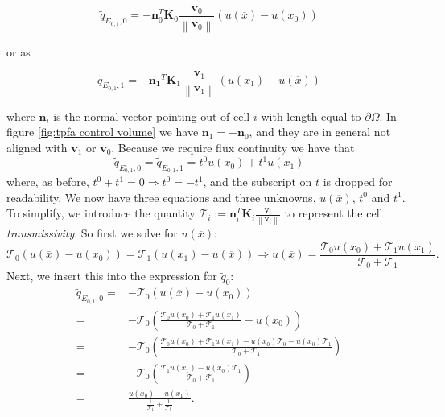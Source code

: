 \documentclass[../Main/main.tex]{subfiles}
\begin{document}
	\begin{equation}\label{eq:f_0}
		\tilde{q}_{E_{0,1},0}=-\bm{n}_0^T \bm{K}_0  \frac{\bm{v}_0}{\left \| \bm{v}_0 \right \|} (u(\overline{x})-u(x_0))
	\end{equation}
	
	or as
	
	\begin{equation}\label{eq:f_1}
		\tilde{q}_{E_{0,1},1} = -\bm{n_1}^T \bm{K}_1  \frac{\bm{v}_1}{\left \| \bm{v}_1 \right \|} (u(x_1)-u(\overline{x}))
	\end{equation}	
	
	where $\bm{n}_i$ is the normal vector pointing out of cell $i$ with length equal to $\partial \Omega$. In figure \ref{fig:tpfa control volume} we have $\bm{n}_1 = -\bm{n}_0$, and they are in general not aligned with $\bm{v}_1$ or $\bm{v}_0$.
	Because we require flux continuity we have that 
	\begin{equation}
		\tilde{q}_{E_{0,1},0} = \tilde{q}_{E_{0,1},1} = t^0 u(x_0) + t^1 u(x_1)
	\end{equation}
	where, as before, $t^0 + t^1 = 0 \Rightarrow t^0 = -t^1$, and the subscript on $t$ is dropped for readability. We now have three equations and three unknowns, $u(\overline{x})$, $t^0$ and $t^1$. To simplify, we introduce the quantity $\mathcal{T}_i := \bm{n}_i^T \bm{K}_i  \frac{\bm{v}_i}{\left \| \bm{v}_i \right \|} $ to represent the cell \emph{transmissivity}. So first we solve for $u(\overline{x})$:
	\begin{equation}
		\mathcal{T}_0(u(\overline{x})-u(x_0)) = \mathcal{T}_1(u(x_1)-u(\overline{x})) \Rightarrow u(\overline{x}) = \frac{\mathcal{T}_0 u(x_0) + \mathcal{T}_1 u(x_1)}{\mathcal{T}_0 + \mathcal{T}_1}.
	\end{equation}
	Next, we insert this into the expression for $\tilde{q}_0$:
	\begin{equation}
		\begin{aligned}
			\tilde{q}_{E_{0,1},0} =& -\mathcal{T}_0(u(\overline{x})-u(x_0)) \\
			=& -\mathcal{T}_0\left (\frac{\mathcal{T}_0 u(x_0) + \mathcal{T}_1 u(x_1)}{\mathcal{T}_0 + \mathcal{T}_1} - u(x_0)\right )\\
			=& -\mathcal{T}_0\left (\frac{\mathcal{T}_0 u(x_0) + \mathcal{T}_1 u(x_1) - u(x_0)\mathcal{T}_0 - u(x_0)\mathcal{T}_1}{\mathcal{T}_0 + \mathcal{T}_1}\right ) \\
			=& -\mathcal{T}_0\left (\frac{ \mathcal{T}_1 u(x_1)  - u(x_0)\mathcal{T}_1}{\mathcal{T}_0 + \mathcal{T}_1}\right)\\
			=& \frac{u(x_0)-u(x_1)}{\frac{1}{\mathcal{T}_1} + \frac{1}{\mathcal{T}_0}}.
		\end{aligned}
	\end{equation}
\end{document}

